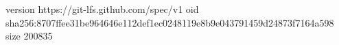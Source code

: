 version https://git-lfs.github.com/spec/v1
oid sha256:8707ffee31be964646e112def1ec0248119e8b9e043791459d24873f7164a598
size 200835
